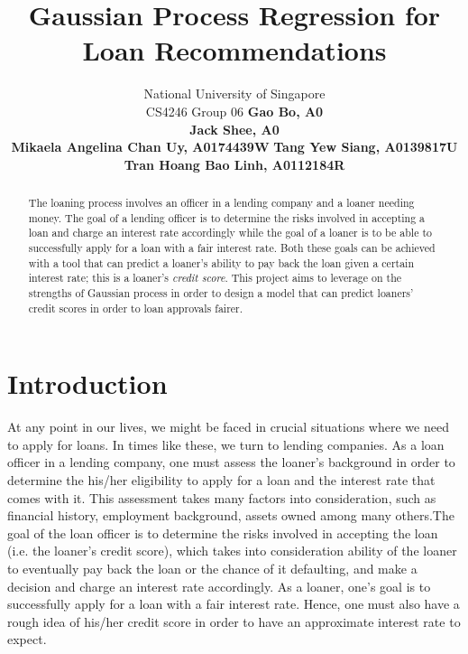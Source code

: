\documentclass[a4paper]{article}
\theoremstyle{genius}
\begin{document}
%
\title{Gaussian Process Regression for Loan Recommendations}
\author{
National University of Singapore \\
CS4246 Group 06 \AND
\normalsize\normalfont\textbf{Gao Bo, A0} \\ 
\normalsize\normalfont\textbf{Jack Shee, A0} \\
\normalsize\normalfont\textbf{Mikaela Angelina Chan Uy, A0174439W} \And
\normalsize\normalfont\textbf{Tang Yew Siang, A0139817U} \\
\normalsize\normalfont\textbf{Tran Hoang Bao Linh, A0112184R}
}

\maketitle
\begin{abstract}
The loaning process involves an officer in a lending company and a loaner needing money. The goal of a lending officer is to determine the risks involved in accepting a loan and charge an interest rate accordingly while the goal of a loaner is to be able to successfully apply for a loan with a fair interest rate. Both these goals can be achieved with a tool that can predict a loaner's ability to pay back the loan given a certain interest rate; this is a loaner's \textit{credit score}. This project aims to leverage on the strengths of Gaussian process in order to design a model that can predict loaners' credit scores in order to loan approvals fairer.
\end{abstract}

\section{Introduction}
\noindent 
At any point in our lives, we might be faced in crucial situations where we need to apply for loans. In times like these, we turn to lending companies. As a loan officer in a lending company, one must assess the loaner's background in order to determine the his/her eligibility to apply for a loan and the interest rate that comes with it. This assessment takes many factors into consideration, such as financial history, employment background, assets owned among many others.The goal of the loan officer is to determine the risks involved in accepting the loan (i.e. the loaner's credit score), which takes into consideration ability of the loaner to eventually pay back the loan or the chance of it defaulting, and make a decision and charge an interest rate accordingly. As a loaner, one's goal is to successfully apply for a loan with a fair interest rate. Hence, one must also have a rough idea of his/her credit score in order to have an approximate interest rate to expect. 
\end{document}
